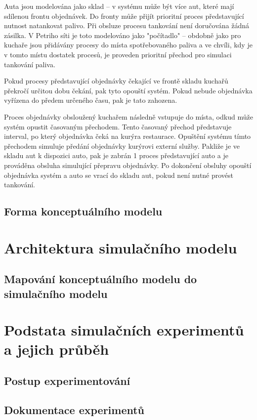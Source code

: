 \documentclass[a4paper, 11pt]{article}
\begin{document}
Auta jsou modelována jako sklad -- v systému může být více aut, které mají sdílenou frontu objednávek. Do fronty může přijít prioritní proces představující nutnost natankovat palivo. Při obsluze procesu tankování není doručována žádná zásilka. V Petriho síti je toto modelováno jako "počítadlo" -- obdobně jako pro kuchaře jsou přidávány procesy do místa spotřebovaného paliva a ve chvíli, kdy je v tomto místu dostatek procesů, je proveden prioritní přechod pro simulaci tankování paliva. 

Pokud procesy představující objednávky čekající ve frontě skladu kuchařů překročí určitou dobu čekání, pak tyto opouští systém. Pokud nebude objednávka vyřízena do předem určeného času, pak je tato zahozena. 

Proces objednávky obsloužený kuchařem následně vstupuje do místa, odkud může systém opustit časovaným přechodem. Tento časovaný přechod představuje interval, po který objednávka čeká na kurýra restaurace. Opuštění systému tímto přechodem simuluje předání objednávky kurýrovi externí služby. Pakliže je ve skladu aut k dispozici auto, pak je zabrán 1 proces představující auto a je prováděna obsluha simulující přepravu objednávky. Po dokončení obsluhy opouští objednávka systém a auto se vrací do skladu aut, pokud není nutné provést tankování. 

\subsection{Forma konceptuálního modelu}

\section{Architektura simulačního modelu}
\subsection{Mapování konceptuálního modelu do simulačního modelu}

\section{Podstata simulačních experimentů a jejich průběh}
\subsection{Postup experimentování}
\subsection{Dokumentace experimentů}
\end{document}
